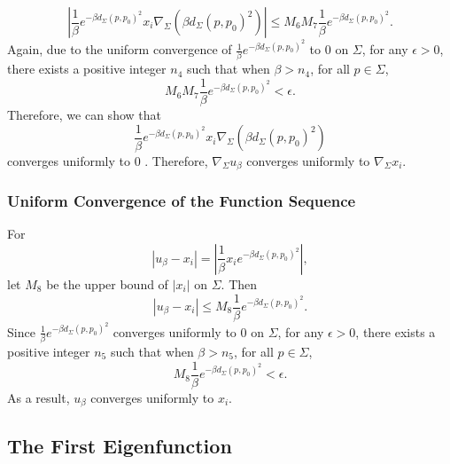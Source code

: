 \documentclass[a4, 12pt]{amsart}
\numberwithin{equation}{section} \numberwithin{equation}{section}
\begin{document}
\begin{equation*}
\left|\frac{1}{\beta} e^{-\beta d_{\Sigma}\left(p, p_{0}\right)^{2}} x_{i} \nabla_{\Sigma}\left(\beta d_{\Sigma}\left(p, p_{0}\right)^{2}\right)\right| \leq M_{6} M_{7} \frac{1}{\beta} e^{-\beta d_{\Sigma}\left(p, p_{0}\right)^{2}}.
\end{equation*}
Again, due to the uniform convergence of $\frac{1}{\beta} e^{-\beta d_{\Sigma}\left(p, p_{0}\right)^{2}}$ to 0 on $\Sigma$, for any $\epsilon>0$, there exists a positive integer $n_{4}$ such that when $\beta>n_{4}$, for all $p \in \Sigma$,
\begin{equation*}M_{6} M_{7} \frac{1}{\beta} e^{-\beta d_{\Sigma}\left(p, p_{0}\right)^{2}}<\epsilon.\end{equation*} Therefore, we can show that \begin{equation*}\frac{1}{\beta} e^{-\beta d_{\Sigma}\left(p, p_{0}\right)^{2}} x_{i} \nabla_{\Sigma}\left(\beta d_{\Sigma}\left(p, p_{0}\right)^{2}\right)\end{equation*} converges uniformly to 0 .
Therefore, $\nabla_{\Sigma} u_{\beta}$ converges uniformly to $\nabla_{\Sigma} x_{i}$.
\subsubsection{Uniform Convergence of the Function Sequence}

For \begin{equation*}\left|u_{\beta}-x_{i}\right|=\left|\frac{1}{\beta} x_{i} e^{-\beta d_{\Sigma}\left(p, p_{0}\right)^{2}}\right|,\end{equation*} let $M_{8}$ be the upper bound of $\left|x_{i}\right|$ on $\Sigma$. Then
\begin{equation*}
\left|u_{\beta}-x_{i}\right| \leq M_{8} \frac{1}{\beta} e^{-\beta d_{\Sigma}\left(p, p_{0}\right)^{2}}.
\end{equation*}
Since $\frac{1}{\beta} e^{-\beta d_{\Sigma}\left(p, p_{0}\right)^{2}}$ converges uniformly to 0 on $\Sigma$, for any $\epsilon>0$, there exists a positive integer $n_{5}$ such that when $\beta>n_{5}$, for all $p \in \Sigma$,
\begin{equation*}M_{8} \frac{1}{\beta} e^{-\beta d_{\Sigma}\left(p, p_{0}\right)^{2}}<\epsilon.\end{equation*} As a result, $u_{\beta}$ converges uniformly to $x_{i}$.
\subsection{The First Eigenfunction}
\end{document}
